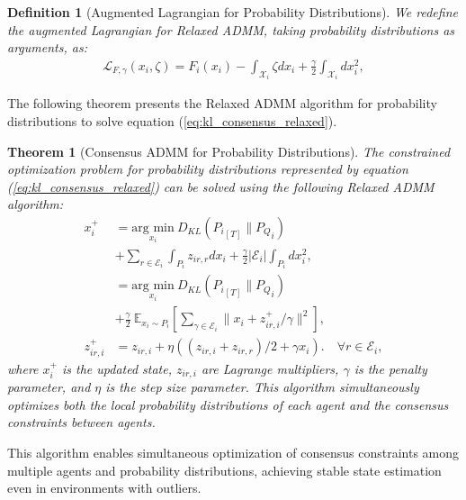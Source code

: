 \documentclass[a4paper,fleqn,10pt,twocolumn]{SICE_ISCS}
\newtheorem{theorem}{Theorem}
\newtheorem{definition}{Definition}
\begin{document}
\begin{definition}[Augmented Lagrangian for Probability Distributions]
We redefine the augmented Lagrangian for Relaxed ADMM, taking probability distributions as arguments, as:
\begin{equation}
\begin{aligned}
 {\mathcal{ L}}_{F,\gamma}(x_i, \zeta) 
 = F_i(x_i) - \int_{{\mathcal{X}}_i}
\zeta dx_i + \frac{\gamma}{2}\int_{{\mathcal{X}}_i} dx_i^2,
\label{eq:relaxed_lagrangian}
\end{aligned}
\end{equation}
\end{definition}

The following theorem presents the Relaxed ADMM algorithm for probability distributions to solve equation (\ref{eq:kl_consensus_relaxed}).

\begin{theorem}[Consensus ADMM for Probability Distributions]
The constrained optimization problem for probability distributions represented by equation (\ref{eq:kl_consensus_relaxed}) can be solved using the following Relaxed ADMM algorithm:
\begin{equation}
\begin{aligned}
x^+_i&= \underset{x_i}{\text{arg min}}\: D_{KL} ({P_i}_{[T]}\|{P_Q}_i) \\
&+ \sum_{r\in {\mathcal{E}}_i} \int_{P_i}  z_{ir,r} dx_i + \frac{\gamma}{2}|{\mathcal{E}}_i|\int_{P_i} dx_i^2,\\
&= \underset{x_i}{\text{arg min}}\: D_{KL} ({P_i}_{[T]}\|{P_Q}_i) \\
&+ \frac{\gamma}{2} \:{\mathbb{E}}_{x_i\sim P_i}\left[\sum_{\gamma \in {\mathcal{E}}_i} \|x_i + z^+_{ir,i}/\gamma \|^2\right],\\
z^+_{ir,i} &=z_{ir,i}+\eta((z_{ir,i} + z_{ir,r})/2 + \gamma x_{i}).\quad  \forall r \in {\mathcal{E}}_i,
\label{eq:prob_relaxed_admm}
\end{aligned}
\end{equation}
where $x^+_i$ is the updated state, $z_{ir,i}$ are Lagrange multipliers, $\gamma$ is the penalty parameter, and $\eta$ is the step size parameter. This algorithm simultaneously optimizes both the local probability distributions of each agent and the consensus constraints between agents.
\end{theorem}

This algorithm enables simultaneous optimization of consensus constraints among multiple agents and probability distributions, achieving stable state estimation even in environments with outliers.
\end{document}
